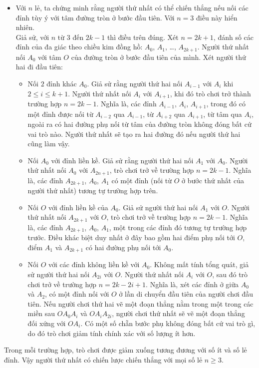 \begin{ex}
{\begin{itemize}
\begin{itemize}
			Sau khi thực hiện các bước $x$ và $x*$, các điểm nối lại không bao gồm tâm, $B=A^*$, $A=B^*$ và bước $x^*$ không làm giảm số điểm. Vậy người thứ hai có thể chiến thằng bằng việc thực hiện bước $z$ bao gồm $x^*$.
		\end{itemize}
		\item Với $n$ lẻ, ta chứng minh rằng người thứ nhất có thể chiến thắng nếu nối các đỉnh tùy ý với tâm đường tròn ở bước đầu tiên. Với $n=3$ điều này hiển nhiên.\\
		Giả sử, với $n$ từ $3$ đến $2k-1$ thì điều trên đúng. Xét $n=2k+1$, đánh số các đỉnh của đa giác theo chiều kim đồng hồ: $A_0$, $A_1$, \ldots, $A_{2k+1}$. Người thứ nhất nối $A_0$ với tâm $O$ của đường tròn ở bước đầu tiên của mình. Xét người thứ hai đi đầu tiên:
		\begin{itemize}
			\item Nối $2$ đỉnh khác $A_0$. Giả sử rằng người thứ hai nối $A_{i-1}$ với $A_i$ khi $2\le i\le k+1$. Người thứ nhất nối $A_i$ với $A_{i+1}$, khi đó trò chơi trở thành trường hợp $n=2k-1$. Nghĩa là, các đỉnh $A_{i-1}$, $A_i$, $A_{i+1}$, trong đó có một đỉnh được nối từ $A_{i-2}$ qua $A_{i-1}$, từ $A_{i+2}$ qua $A_{i+1}$, từ tâm qua $A_i$, ngoài ra có hai đường phụ nối từ tâm của đường tròn không đóng bất cứ vai trò nào. Người thứ nhất sẽ tạo ra hai đường đó nếu người thứ hai cũng làm vậy.
			\item Nối $A_0$ với đỉnh liền kề. Giả sử rằng người thứ hai nối $A_1$ với $A_0$. Người thứ nhất nối $A_0$ với $A_{2n+1}$, trò chơi trở về trường hợp $n=2k-1$. Nghĩa là, các đỉnh $A_{2k+1}$, $A_0$, $A_1$ có một đỉnh (nối từ $O$ ở bước thứ nhất của người thứ nhất) tương tự trường hợp trên.
			\item Nối $O$ với đỉnh liền kề của $A_0$. Giả sử người thứ hai nối $A_1$ với $O$. Người thứ nhất nối $A_{2k+1}$ với $O$, trò chơi trở về trường hợp $n=2k-1$. Nghĩa là, các đỉnh $A_{2k+1}$, $A_0$, $A_1$, một trong các đỉnh đó tương tự trường hợp trước. Điều khác biệt duy nhất ở đây bao gồm hai điểm phụ nối tới $O$, điểm $A_1$ và $A_{2k+1}$ có hai đường phụ nối tới $A_0$.
			\item Nối $O$ với các đỉnh không liền kề với $A_0$. Không mất tính tổng quát, giả sử người thứ hai nối $A_{2i}$ với $O$. Người thứ nhất nối $A_i$ với $O$, sau đó trò chơi trở về trường hợp $n=2k-2i+1$. Nghĩa là, xét các đỉnh ở giữa $A_0$ và $A_2$, có một đỉnh nối với $O$ ở lần di chuyển đầu tiên của người chơi đầu tiên. Nếu người chơi thứ hai vẽ một đoạn thẳng nằm trong một trong các miền sau $OA_0A_i$ và $OA_iA_{2i}$, người chơi thứ nhất sẽ vẽ một đoạn thẳng đối xứng với $OA_i$. Có một số chẵn bước phụ không đóng bất cứ vai trò gì, do đó trò chơi giảm tính chính xác với số lượng ít hơn.
		\end{itemize} 
	\end{itemize}
Trong mỗi trường hợp, trò chơi được giảm xuống tương đương với số ít và số lẻ đỉnh. Vậy người thứ nhất có chiến lược chiến thắng với mọi số lẻ $n\ge 3$.
}
\end{ex}


